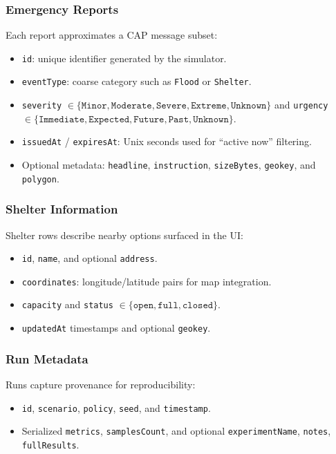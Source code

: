 \subsubsection{Emergency Reports}
Each report approximates a CAP message subset:
\begin{itemize}
    \item \texttt{id}: unique identifier generated by the simulator.
    \item \texttt{eventType}: coarse category such as \texttt{Flood} or \texttt{Shelter}.
    \item \texttt{severity} $\in \{\texttt{Minor}, \texttt{Moderate}, \texttt{Severe}, \texttt{Extreme}, \texttt{Unknown}\}$ and \texttt{urgency} $\in \{\texttt{Immediate}, \texttt{Expected}, \texttt{Future}, \texttt{Past}, \texttt{Unknown}\}$.
    \item \texttt{issuedAt} / \texttt{expiresAt}: Unix seconds used for ``active now'' filtering.
    \item Optional metadata: \texttt{headline}, \texttt{instruction}, \texttt{sizeBytes}, \texttt{geokey}, and \texttt{polygon}.
\end{itemize}

\subsubsection{Shelter Information}
Shelter rows describe nearby options surfaced in the UI:
\begin{itemize}
    \item \texttt{id}, \texttt{name}, and optional \texttt{address}.
    \item \texttt{coordinates}: longitude/latitude pairs for map integration.
    \item \texttt{capacity} and \texttt{status} $\in \{\texttt{open}, \texttt{full}, \texttt{closed}\}$.
    \item \texttt{updatedAt} timestamps and optional \texttt{geokey}.
\end{itemize}

\subsubsection{Run Metadata}
Runs capture provenance for reproducibility:
\begin{itemize}
    \item \texttt{id}, \texttt{scenario}, \texttt{policy}, \texttt{seed}, and \texttt{timestamp}.
    \item Serialized \texttt{metrics}, \texttt{samplesCount}, and optional \texttt{experimentName}, \texttt{notes}, \texttt{fullResults}.
\end{itemize}

